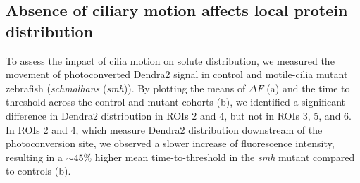 \documentclass[fleqn]{wlscirep}
\begin{document}

\subsection*{Absence of ciliary motion affects local protein distribution}
To assess the impact of cilia motion on solute distribution, we measured the movement of photoconverted Dendra2 signal
in control and motile-cilia mutant zebrafish (\emph{schmalhans} (\emph{smh})).
By plotting the means of $\Delta F$ (a) and the time to threshold
across the control and mutant cohorts (b), we identified a significant
difference in Dendra2 distribution in ROIs 2 and 4, but not in ROIs 3, 5, and 6. In ROIs 2 and 4,
which measure Dendra2 distribution downstream of the photoconversion site,
we observed a slower increase of fluorescence intensity,
resulting in a $\sim 45\%$ higher mean time-to-threshold in the \emph{smh}
mutant compared to controls (b). 
\end{document}
